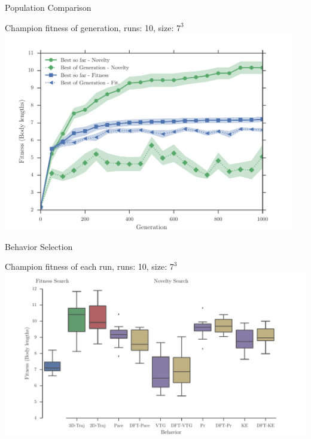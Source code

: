 \documentclass[6pt]{beamer}
\begin{document}
{\begin{frame}{Population Comparison}
\begin{block}{Champion fitness of generation, runs: 10, size: $7^3$}
\centering
\includegraphics[width=0.95\textwidth]{../Figures/Results/AvgGenerChampNoveltyFitnessSize7.pdf}
\end{block}
\end{frame}

\begin{frame}{Behavior Selection}
\begin{block}{Champion fitness of each run, runs: 10, size: $7^3$}
\centering
\includegraphics[width=1.0\textwidth]{../Figures/Results/BehaviorsPerformance.pdf}
\end{block}
\end{frame}


}
\end{document}
